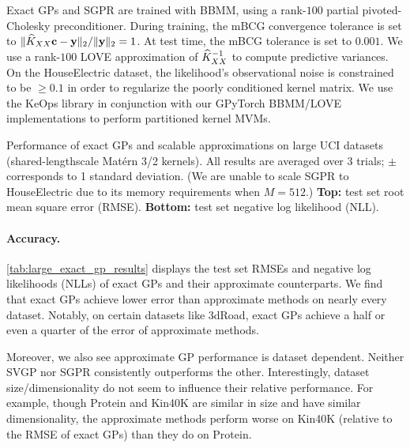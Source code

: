 Exact GPs and SGPR are trained with BBMM, using a rank-$100$ partial pivoted-Cholesky preconditioner.
During training, the mBCG convergence tolerance is set to  $\Vert \widehat{K}_{XX} \mathbf{c} - \mathbf{y} \Vert_2 / \Vert \mathbf{y} \Vert_2 = 1$.
At test time, the mBCG tolerance is set to $0.001$.
We use a rank-$100$ LOVE approximation of $\widehat{K}_{XX}^{-1}$ to compute predictive variances.
On the HouseElectric dataset, the likelihood's observational noise is constrained to be $\geq 0.1$ in order to regularize the poorly conditioned kernel matrix.
We use the KeOps library \cite{charlier2020kernel} in conjunction with our GPyTorch BBMM/LOVE implementations to perform partitioned kernel MVMs.

\begin{table}[!tb]
  \caption[Performance of exact GPs and scalable approximations on large UCI datasets.]{
    Performance of exact GPs and scalable approximations on large UCI datasets (shared-lengthscale Mat\'ern 3/2 kernels).
    All results are averaged over 3 trials; $\pm$ corresponds to 1 standard deviation.
    (We are unable to scale SGPR to HouseElectric due to its memory requirements when $M=512$.)
    {\bf Top:} test set root mean square error (RMSE).
    {\bf Bottom:} test set negative log likelihood (NLL).
  }
  \label{tab:large_exact_gp_results}
  \centering
  \vspace{1em}

  \resizebox{\textwidth}{!}{%
    
  }
  \vspace{1em}

  \resizebox{\textwidth}{!}{%
    
  }
  \vspace{1em}
\end{table}

\paragraph{Accuracy.}
\cref{tab:large_exact_gp_results} displays the test set RMSEs and negative log likelihoods (NLLs) of exact GPs and their approximate counterparts.
We find that exact GPs achieve lower error than approximate methods on nearly every dataset.
Notably, on certain datasets like 3dRoad, exact GPs achieve a half or even a quarter of the error of approximate methods.

Moreover, we also see approximate GP performance is dataset dependent.
Neither SVGP nor SGPR consistently outperforms the other.
Interestingly, dataset size/dimensionality do not seem to influence their relative performance.
For example, though Protein and Kin40K are similar in size and have similar dimensionality, the approximate methods perform worse on Kin40K (relative to the RMSE of exact GPs) than they do on Protein.


